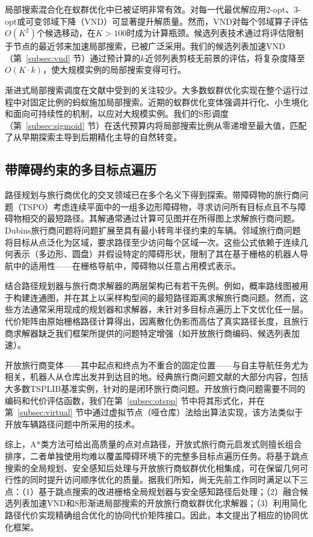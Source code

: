 \documentclass[lettersize,journal]{IEEEtran}
\begin{document}
局部搜索混合化在蚁群优化中已被证明非常有效。对每一代最优解应用2-opt、3-opt或可变邻域下降（VND）可显著提升解质量\cite{ref24,ref25}。然而，VND对每个邻域算子评估$O(K^2)$个候选移动，在$K > 100$时成为计算瓶颈。候选列表技术通过将评估限制于节点的最近邻来加速局部搜索，已被广泛采用\cite{ref26}。我们的候选列表加速VND（第~\ref{subsec:vnd} 节）通过预计算的$k$近邻列表剪枝无前景的评估，将复杂度降至$O(K \cdot k)$，使大规模实例的局部搜索变得可行。

渐进式局部搜索调度在文献中受到的关注较少。大多数蚁群优化实现在整个运行过程中对固定比例的蚂蚁施加局部搜索。近期的蚁群优化变体强调并行化、小生境化和面向可持续性的机制，以应对大规模实例\cite{ref27,ref28,ref29,ref30}。我们的S形调度（第~\ref{subsec:sigmoid} 节）在迭代预算内将局部搜索比例从零递增至最大值，匹配了从早期探索主导到后期精化主导的自然转变。

\subsection{带障碍约束的多目标点遍历}

路径规划与旅行商优化的交叉领域已在多个名义下得到探索\cite{ref4}。带障碍物的旅行商问题（TSPO）考虑连续平面中的一组多边形障碍物，寻求访问所有目标点且不与障碍物相交的最短路径\cite{ref3}。其解通常通过计算可见图并在所得图上求解旅行商问题。Dubins旅行商问题将问题扩展至具有最小转弯半径约束的车辆。邻域旅行商问题将目标从点泛化为区域，要求路径至少访问每个区域一次。这些公式依赖于连续几何表示（多边形、圆盘）并假设特定的障碍形状，限制了其在基于栅格的机器人导航中的适用性——在栅格导航中，障碍物以任意占用模式表示。

结合路径规划器与旅行商求解器的两层架构已有若干先例\cite{ref1,ref2}。例如，概率路线图被用于构建连通图，并在其上以采样构型间的最短路径距离求解旅行商问题。然而，这些方法通常采用现成的规划器和求解器，未针对多目标点遍历上下文优化任一层。代价矩阵由原始栅格路径计算得出，因离散化伪影而高估了真实路径长度，且旅行商求解器缺乏我们框架所提供的问题特定增强（如开放旅行商编码、候选列表加速）。

开放旅行商变体——其中起点和终点为不重合的固定位置——与自主导航任务尤为相关，机器人从仓库出发并到达目的地。经典旅行商问题文献的大部分内容，包括大多数TSPLIB基准实例，针对的是闭环旅行商问题。开放旅行商问题需要不同的编码和代价评估函数，我们在第~\ref{subsec:otspp} 节中将其形式化，并在第~\ref{subsec:virtual} 节中通过虚拟节点（哑仓库）法给出算法实现，该方法类似于开放车辆路径问题中所采用的技术\cite{ref31,ref32}。

综上，A*类方法可给出高质量的点对点路径，开放式旅行商元启发式则擅长组合排序，二者单独使用均难以覆盖障碍环境下的完整多目标点遍历任务。将基于跳点搜索的全局规划、安全感知后处理与开放旅行商蚁群优化相集成，可在保留几何可行性的同时提升访问顺序优化的质量。据我们所知，尚无先前工作同时满足以下三点：（1）基于跳点搜索的改进栅格全局规划器与安全感知路径后处理；（2）融合候选列表加速VND和S形渐进局部搜索的开放旅行商蚁群优化求解器；（3）利用简化路径代价实现精确组合优化的协同代价矩阵接口。因此，本文提出了相应的协同优化框架。
\end{document}
